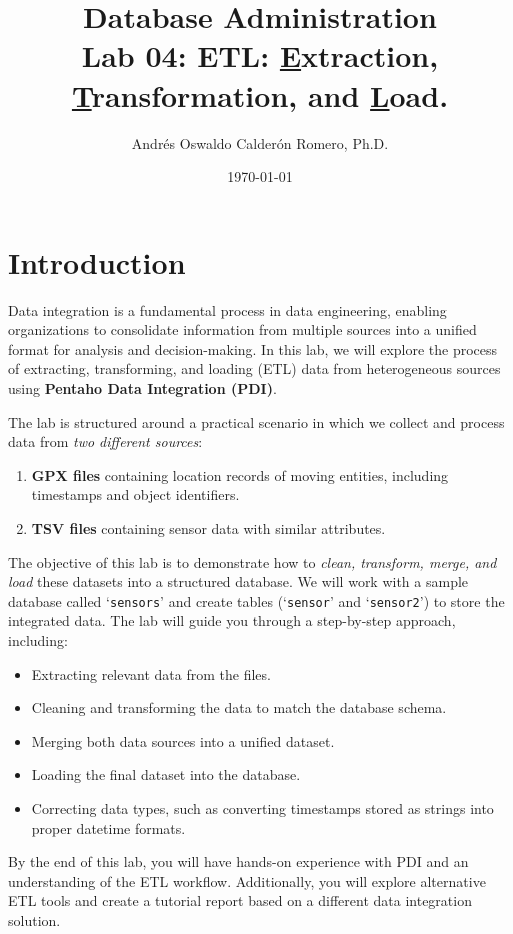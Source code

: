 \documentclass{article}
\title{Database Administration \\ Lab 04: ETL: \underline{E}xtraction, \underline{T}ransformation, and \underline{L}oad.}
\author{Andrés Oswaldo Calderón Romero, Ph.D.}
\date{\today}
\begin{document}
\maketitle

\section{Introduction}

Data integration is a fundamental process in data engineering, enabling organizations to consolidate information from multiple sources into a unified format for analysis and decision-making. In this lab, we will explore the process of extracting, transforming, and loading (ETL) data from heterogeneous sources using \textbf{Pentaho Data Integration (PDI)}.

The lab is structured around a practical scenario in which we collect and process data from \textit{two different sources}:

\begin{enumerate}
    \item \textbf{GPX files} containing location records of moving entities, including timestamps and object identifiers.
    \item \textbf{TSV files} containing sensor data with similar attributes.
\end{enumerate}

The objective of this lab is to demonstrate how to \textit{clean, transform, merge, and load} these datasets into a structured database. We will work with a sample database called `\texttt{sensors}' and create tables (`\texttt{sensor}' and `\texttt{sensor2}') to store the integrated data. The lab will guide you through a step-by-step approach, including:

\begin{itemize}
    \item Extracting relevant data from the files.
    \item Cleaning and transforming the data to match the database schema.
    \item Merging both data sources into a unified dataset.
    \item Loading the final dataset into the database.
    \item Correcting data types, such as converting timestamps stored as strings into proper datetime formats.
\end{itemize}

By the end of this lab, you will have hands-on experience with PDI and an understanding of the ETL workflow. Additionally, you will explore alternative ETL tools and create a tutorial report based on a different data integration solution.
\end{document}
